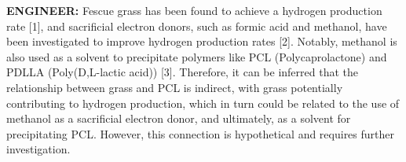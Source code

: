 \documentclass{article}
\begin{document}
\begin{rightbubbles}
\textbf{ENGINEER:} Fescue grass has been found to achieve a hydrogen production rate [1], and sacrificial electron donors, such as formic acid and methanol, have been investigated to improve hydrogen production rates [2]. Notably, methanol is also used as a solvent to precipitate polymers like PCL (Polycaprolactone) and PDLLA (Poly(D,L-lactic acid)) [3]. Therefore, it can be inferred that the relationship between grass and PCL is indirect, with grass potentially contributing to hydrogen production, which in turn could be related to the use of methanol as a sacrificial electron donor, and ultimately, as a solvent for precipitating PCL. However, this connection is hypothetical and requires further investigation.
\end{rightbubbles}
\end{document}
